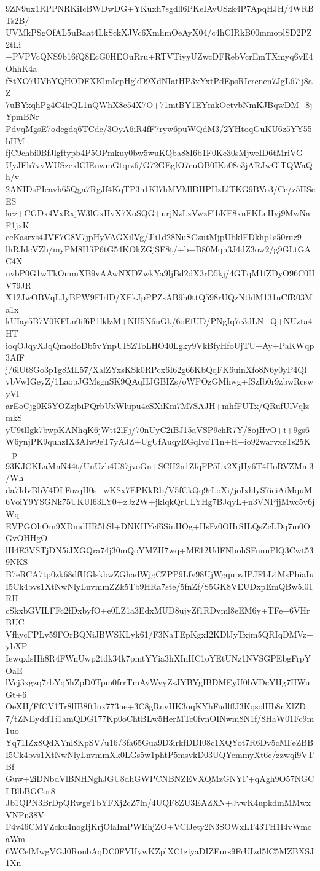 9ZN9ux1RPPNRKiIcBWDwDG+YKuxh7sgdll6PKeIAvUSzk4P7ApqHJH/4WRBTs2B/
UVMkPSgOfAL5uBaat4LkSckXJVc6XmhmOeAyX04/c4hCIRkB00mmoplSD2PZ2tLi
+PVPVcQNS9b16fQ8EcG0HEOuRru+RTVTiyyUZwcDFRebVcrEmTXmyq6yE4OhhK4a
fStXO7UVbYQHODFXKlmIepHgkD9XdNIatHP3xYxtPdEpsRIcrcnen7JgL67ij8aZ
7uBYxqhPg4C4lrQL1nQWhX8c54X7O+71mtBY1EYmkOetvbNmKJBqwDM+8jYpmBNr
PdvqMgsE7odcgdq6TCdc/3OyA6iR4fF7ryw6puWQdM3/2YHtoqGuKU6z5YY55bHM
fjC9chbi0BfJlgftypb4P5OPmkuy0bw5wuKQba88I6b1F0Kc30sMjweID6tMriVG
UyJFh7vvWUSzexlCIEnwmGtqrz6/G72GEgfO7cuOB0IKa08e3jARJwGlTQWaQh/v
2ANIDsPIeavh65Qga7RgJf4KqTP3n1KI7hMVMlDHPHzLlTKG9BVo3/Cc/z5HScES
kcz+CGDx4VxRxjW3lGxHvX7XoSQG+urjNzLzVwzFlbKF8xnFKLeHvj9MwNaF1jxK
ccKasrxs4JVF7G8V7jpHyVAGXilVg/Jli1d28NuSCzutMjpUbklFDkhp1s50ruz9
lhRJdcVZh/myPM8HfiP6tG54KOkZGjSF8t/+b+B80Mqn3J4dZ3ow2/g9GLtGAC4X
nvbP0G1wTkOmmXB9vAAwNXDZwkYa9ljBd2dX3rD5kj/4GTqM1fZDyO96C0HV79JR
X12JwOBVqLJyBPW9FIrlD/XFkJpPPZsAB9h0ttQ598rUQzNthlM131uCfR03Ma1x
kUIay5B7V0KFLn0if6P1lklzM+NH5N6uGk/6oEfUD/PNgIq7e3dLN+Q+NUzta4HT
ioqOJqyXJqQmoBoDb5vYnpUISZToLHO40Lgky9VkBfyHfoUjTU+Ay+PaKWqp3AfF
j/6lUt8Go3p1g8ML57/XalZYxsKSk0RPcx6I62g66KbQqFK6uinXfo8N6y0yP4Ql
vbVwIGeyZ/1LaopJGMsgnSK9QAqHJGBIZs/oWPOzGMhwg+fSzIb0r9zbwRcswyVl
arEoCjg0K5YOZzjbiPQrbUxWlupu4cSXiKm7M7SAJH+mhfFUTx/QRufUlVqlzmkS
yU9tlIgk7bwpKANhqK6jWtt2lFj/70nUyC2iBJ15aVSP9chR7Y/8ojHvO+t+9gs6
W6ynjPK9quhzIX3AIw9eT7yAJZ+UgUfAuqyEGqIvcT1n+H+io92warvxeTs25K+p
93KJCKLaMnN44t/UnUzb4U87jvoGn+SCH2n1ZfqFP5Lx2XjHy6T4HoRVZMni3/Wh
da7IdvBbV4DLFozqH0s+wKSx7EPKkRb/V5fCkQq9rLoXi/joIxhlyS7ieiAiMquM
6VoiY9YSGNk75UKUl63LY0+zJz2W+jklqkQrULYHg7BJqyL+n3VNPjjMwc5v6jWq
EVPGOhOm9XDmdHR5bSl+DNKHYcf6SinHOg+HsFz0OHrSILQsZcLDq7m0OGvOHHgO
lH4E3VSTjDN5iJXGQra74j30mQoYMZH7wq+ME12UdFNbohSFnnnPlQ3Cwt539NKS
B7eRCA7tp0zk68dfUGlskbwZGhadWjgCZPP9Lfv98UjWgqupvIPJFbL4MsPhiaIu
I5Ck4bvs1XtNwNlyLnvmmZZk5Tb9HRa7ste/5fnZf/S5GK8VEUDxpEmQBw5l01RH
cSkxbGVILFFc2fDxbyfO+e0LZ1a3EdxMUD8ujyZf1RDvml8eEM6y+TFe+6VHrBUC
VfhycFPLv59FOrBQNiJBWSKLyk61/F3NaTEpKgxI2KDlJyTxjm5QRIqDMVz+ybXP
IewqxlsHh8R4FWnUwp2tdk34k7pmtYYia3hXInHC1oYEtUNz1NVSGPEbgFrpYOaE
lVcj3xgzq7rbYq5hZpD0Tpm0frrTmAyWvyZsJYBYgIBDMEyU0bVDcYHg7HWuGt+6
OeXH/FfCV1Tr8lIB8ftIux773ne+3C8gRnvHK3oqKYhFudlffJ3KqsolHb8nXlZD
7/tZNEyddTi1amQDG177Kp0oChtBLw5HerMTc0fvnOINwm8N1f/8HaW01Fc9m1uo
Yq71IZx8QdXYnl8KpSV/u16/3fa65Gua9D3irkfDDI08c1XQYot7R6Dv5cMFeZBB
I5Ck4bvs1XtNwNlyLnvmmXk0LGs5w1phtP5msvkD03UQYemmyXt6c/zzwqi9VTBf
Guw+2iDNbdVlBNHNghJGU8dhGWPCNBNZEVXQMzGNYF+qAgh9O57NGCLBlbBGCor8
Jb1QPN3BrDpQRwgeTbYFXj2cZ7ln/4UQF8ZU3EAZXN+JvwK4upkdmMMwxVNPu38V
F4v46CMYZcku4nogIjKrjOlaImPWEhjZO+VClJety2N3SOWxLT43TH1I4vWmcaWm
6WCefMwgVGJ0RonbAqDC0FVHywKZplXC1ziyaDIZEurs9FrUIzd5lC5MZBXSJ1Xn
